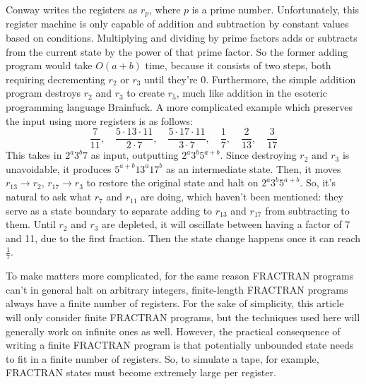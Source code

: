 \documentclass[12pt]{article}
\begin{document}
Conway writes the registers as $r_p$, where $p$ is a prime number. Unfortunately, this register machine is only capable of addition and subtraction by constant values based on conditions. Multiplying and dividing by prime factors adds or subtracts from the current state by the power of that prime factor. So the former adding program would take $O(a+b)$ time, because it consists of two steps, both requiring decrementing $r_2$ or $r_3$ until they're 0. Furthermore, the simple addition program destroys $r_2$ and $r_3$ to create $r_5$, much like addition in the esoteric programming language Brainfuck. A more complicated example which preserves the input using more registers is as follows:
\[
\frac{7}{11},\quad
\frac{5 \cdot 13 \cdot 11}{2 \cdot 7},\quad
\frac{5 \cdot 17 \cdot 11}{3 \cdot 7},\quad
\frac{1}{7},\quad
\frac{2}{13},\quad
\frac{3}{17}
\]
This takes in $2^a 3^b 7$ as input, outputting $2^a 3^b 5^{a+b}$. Since destroying $r_2$ and $r_3$ is unavoidable, it produces $5^{a+b} 13^a 17^b$ as an intermediate state. Then, it moves $r_{13} \to r_2$, $r_{17} \to r_3$ to restore the original state and halt on $2^a 3^b 5^{a+b}$. So, it's natural to ask what $r_7$ and $r_{11}$ are doing, which haven't been mentioned: they serve as a state boundary to separate adding to $r_{13}$ and $r_{17}$ from subtracting to them. Until $r_2$ and $r_3$ are depleted, it will oscillate between having a factor of 7 and 11, due to the first fraction. Then the state change happens once it can reach $\frac{1}{7}$.

To make matters more complicated, for the same reason FRACTRAN programs can't in general halt on arbitrary integers, finite-length FRACTRAN programs always have a finite number of registers. For the sake of simplicity, this article will only consider finite FRACTRAN programs, but the techniques used here will generally work on infinite ones as well. However, the practical consequence of writing a finite FRACTRAN program is that potentially unbounded state needs to fit in a finite number of registers. So, to simulate a tape, for example, FRACTRAN states must become extremely large per register.
\end{document}
